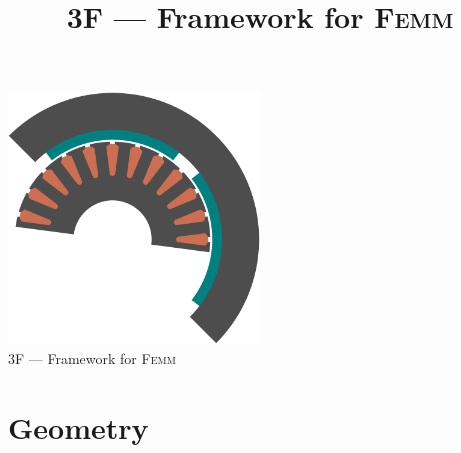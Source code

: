 \documentclass[a4paper,11pt,oneside,fleqn,titlepage]{report}
\title{3F --- Framework for \textsc{Femm}}
\author{}
\begin{document}
\begin{titlepage}
\centering
\includegraphics[width=0.5\textwidth]{../more/icon/icon.pdf}
\\[2cm]

\LARGE 3F --- Framework for \textsc{Femm}
\vfill
\end{titlepage}


\tableofcontents

\chapter{Geometry}
\end{document}
